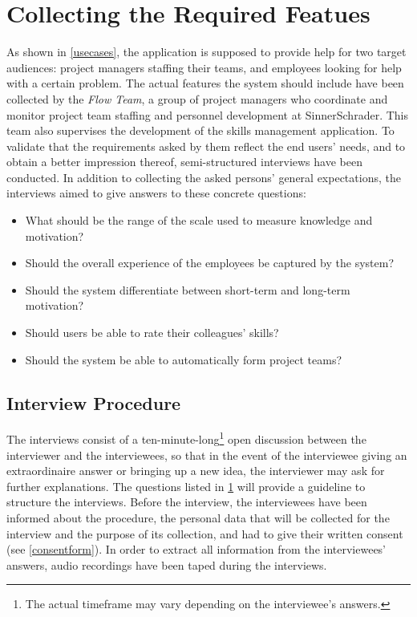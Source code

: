 \section{Collecting the Required Featues}
\label{interviewquestions}
As shown in \ref{usecases}, the application is supposed to provide help for two target audiences: project managers staffing their teams, and employees looking for help with a certain problem.
The actual features the system should include have been collected by the \textit{Flow Team}, a group of project managers who coordinate and monitor project team staffing and personnel development at SinnerSchrader. This team also supervises the development of the skills management application. To validate that the requirements asked by them reflect the end users' needs, and to obtain a better impression thereof, semi-structured interviews have been conducted. In addition to collecting the asked persons' general expectations, the interviews aimed to give answers to these concrete questions:
\begin{itemize}
	\item What should be the range of the scale used to measure knowledge and motivation?
	\item Should the overall experience of the employees be captured by the system?
	\item Should the system differentiate between short-term and long-term motivation?
	\item Should users be able to rate their colleagues' skills?
	\item Should the system be able to automatically form project teams?
\end{itemize}

\subsection{Interview Procedure}
The interviews consist of a ten-minute-long\footnote{The actual timeframe may vary depending on the interviewee's answers.} open discussion between the interviewer and the interviewees, so that in the event of the interviewee giving an extraordinaire answer or bringing up a new idea, the interviewer may ask for further explanations. The questions listed in \ref{interviewquestions} will provide a guideline to structure the interviews. Before the interview, the interviewees have been informed about the procedure, the personal data that will be collected for the interview and the purpose of its collection, and had to give their written consent (see \ref{consentform}).
In order to extract all information from the interviewees' answers, audio recordings have been taped during the interviews.

